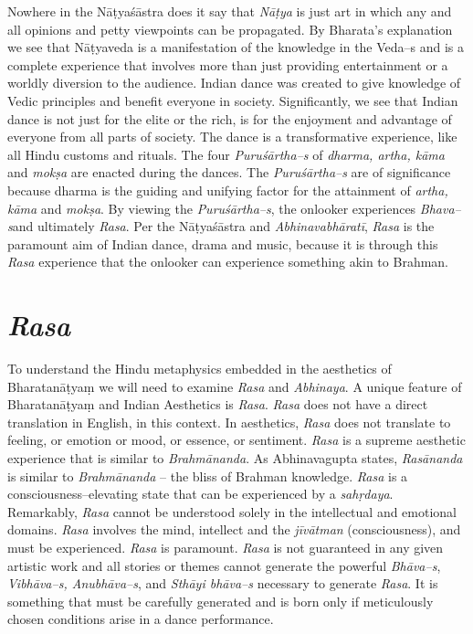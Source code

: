 Nowhere in the Nāṭyaśāstra does it say that \textit{Nāṭya} is just art in which any and all opinions and petty viewpoints can be propagated. By Bharata’s explanation we see that Nāṭyaveda is a manifestation of the knowledge in the Veda–s and is a complete experience that involves more than just providing entertainment or a worldly diversion to the audience. Indian dance was created to give knowledge of Vedic principles and benefit everyone in society. Significantly, we see that Indian dance is not just for the elite or the rich, is for the enjoyment and advantage of everyone from all parts of society. The dance is a transformative experience, like all Hindu customs and rituals. The four \textit{Puruśārtha–s} of \textit{dharma, artha, kāma }and \textit{mokṣa} are enacted during the dances. The \textit{Puruśārtha–s} are of significance because dharma is the guiding and unifying factor for the attainment of \textit{artha, kāma }and \textit{mokṣa}. By viewing the \textit{Puruśārtha–s}, the onlooker experiences \textit{Bhava–s}\break and ultimately \textit{Rasa}. Per the Nāṭyaśāstra and \textit{Abhinavabhāratī}, \textit{Rasa} is the paramount aim of Indian dance, drama and music, because it is through this \textit{Rasa} experience that the onlooker can experience something akin to Brahman.


\section*{\textit{Rasa}}

To understand the Hindu metaphysics embedded in the aesthetics of Bharatanāṭyaṃ we will need to examine \textit{Rasa} and \textit{Abhinaya}. A unique feature of Bharatanāṭyaṃ and Indian Aesthetics is \textit{Rasa}. \textit{Rasa} does not have a direct translation in English, in this context. In aesthetics, \textit{Rasa} does not translate to feeling, or emotion or mood, or essence, or sentiment. \textit{Rasa} is a supreme aesthetic experience that is similar to \textit{Brahmānanda}. As Abhinavagupta states, \textit{Rasānanda} is similar to \textit{Brahmānanda} – the bliss of Brahman knowledge. \textit{Rasa} is a consciousness–elevating state that can be experienced by a \textit{sahṛdaya}. Remarkably, \textit{Rasa} cannot be understood solely in the intellectual and emotional domains. \textit{Rasa} involves the mind, intellect and the \textit{jīvātman} (consciousness), and must be experienced. \textit{Rasa} is paramount. \textit{Rasa} is not guaranteed in any given artistic work and all stories or themes cannot generate the powerful \textit{Bhāva–s}, \textit{Vibhāva–s, Anubhāva–s}, and \textit{Sthāyi bhāva–s} necessary to generate \textit{Rasa}. It is something that must be carefully generated and is born only if meticulously chosen conditions arise in a dance performance.

